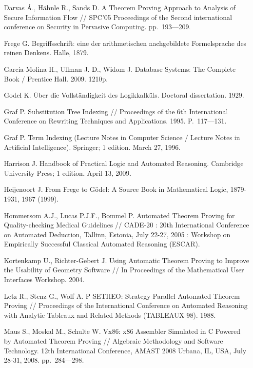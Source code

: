 \begin{thebibliography}{99}
 Darvas Á., Hähnle R., Sands D. A Theorem Proving Approach to Analysis of Secure Information Flow // SPC'05 Proceedings of the Second international conference on Security in Pervasive Computing. pp.~193---209.

 Frege G. Begriffsschrift: eine der arithmetischen nachgebildete Formelsprache des reinen Denkens. Halle, 1879.

 Garcia-Molina H., Ullman J. D., Widom J. Database Systems: The Complete Book / Prentice Hall. 2009. 1210p.

 Godel K. Über die Vollständigkeit des Logikkalküls. Doctoral dissertation. 1929.

 Graf P. Substitution Tree Indexing // Proceedings of the 6th International Conference on Rewriting Techniques and Applications. 1995. P.~117---131.

 Graf P. Term Indexing (Lecture Notes in Computer Science / Lecture Notes in Artificial Intelligence). Springer; 1 edition. March 27, 1996.

 Harrison J. Handbook of Practical Logic and Automated Reasoning. Cambridge University Press; 1 edition. April 13, 2009.


 Heijenoort J. From Frege to Gödel: A Source Book in Mathematical Logic, 1879-1931, 1967 (1999).

 Hommersom A.J., Lucas P.J.F., Bommel P. Automated Theorem Proving for Quality-checking Medical Guidelines // CADE-20 : 20th International Conference on Automated Deduction, Tallinn, Estonia, July 22-27, 2005 : Workshop on Empirically Successful Classical Automated Reasoning (ESCAR).


 Kortenkamp U., Richter-Gebert J. Using Automatic Theorem Proving to Improve the Usability of Geometry Software // In Proceedings of the Mathematical User Interfaces Workshop. 2004.


  Letz R., Stenz G., Wolf A. P-SETHEO: Strategy Parallel Automated Theorem Proving // Proceedings of the International Conference on Automated Reasoning with Analytic Tableaux and Related Methods (TABLEAUX-98). 1988.

 Maus S., Moskal M., Schulte W. Vx86: x86 Assembler Simulated in C Powered by Automated Theorem Proving // Algebraic Methodology and Software Technology. 12th International Conference, AMAST 2008 Urbana, IL, USA, July 28-31, 2008. pp.~284---298.


\end{thebibliography}
